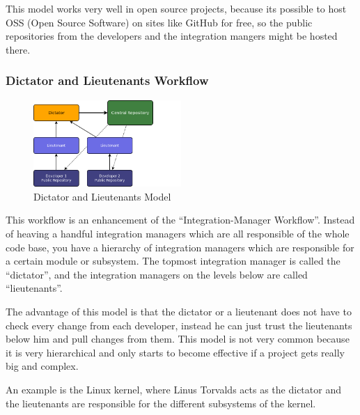 This model works very well in open source projects, because its possible to host OSS (Open Source Software) on 
sites like GitHub for free, so the public repositories from the developers and the integration mangers might be hosted there.


\subsubsection{Dictator and Lieutenants Workflow}

\begin{figure}[ht]
  \centering
  \includegraphics[width=0.5\textwidth]{img/Mod_Dictator}
  \caption{Dictator and Lieutenants Model}
  \label{fig:mod_dictator} 
\end{figure}

This workflow is an enhancement of the “Integration-Manager Workflow”. Instead of heaving a handful 
integration managers which are all responsible of the whole code base, you have a hierarchy of integration 
managers which are responsible for a certain module or subsystem. The topmost integration manager is called 
the “dictator”, and the integration managers on the levels below are called “lieutenants”.

The advantage of this model is that the dictator or a lieutenant does not have to check every change from 
each developer, instead he can just trust the lieutenants below him and pull changes from them. This model 
is not very common because it is very hierarchical and only starts to become effective if a project gets really big and complex.

An example is the Linux kernel, where Linus Torvalds acts as the dictator and the lieutenants are 
responsible for the different subsystems of the kernel.
